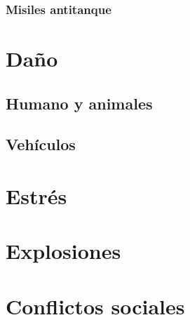         \subsubsection{Misiles antitanque}

\section{Daño}

\subsection{Humano y animales}

\subsection{Vehículos}

\section{Estrés}

\section{Explosiones}

\section{Conflictos sociales}

